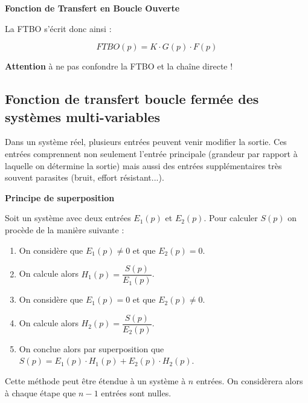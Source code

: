 \documentclass[11pt,oneside]{article}
\begin{document}
\begin{resultat}
\textbf{Fonction de Transfert en Boucle Ouverte}

La FTBO s'écrit donc ainsi :

$$
FTBO(p) = K \cdot G(p) \cdot F(p)
$$

\textbf{Attention} à ne pas confondre la FTBO et la chaîne directe !
\end{resultat}

\subsection{Fonction de transfert boucle fermée des systèmes multi-variables}
Dans un système réel, plusieurs entrées peuvent venir modifier la sortie. Ces
entrées comprennent non seulement l'entrée principale (grandeur par rapport à
laquelle on détermine la sortie) mais aussi des entrées
supplémentaires très souvent parasites (bruit, effort résistant...).

\begin{center}
\end{center}


\begin{methode}
\textbf{Principe de superposition}

Soit un système avec deux entrées $E_1(p)$ et $E_2(p)$. Pour calculer $S(p)$ on procède de la manière suivante : 
\begin{enumerate}
\item On considère que $E_1(p)\neq 0$ et que $E_2(p)=0$.
\item On calcule alors $H_1(p)=\dfrac{S(p)}{E_1(p)}$.
\item On considère que $E_1(p) = 0$ et que $E_2(p) \neq 0$.
\item On calcule alors $H_2(p)=\dfrac{S(p)}{E_2(p)}$.
\item On conclue alors par superposition que $S(p)=E_1(p) \cdot H_1(p) + E_2(p) \cdot H_2(p)$.
\end{enumerate}

Cette méthode peut être étendue à un système à $n$ entrées. On considèrera alors à chaque étape que $n-1$ entrées sont nulles.
\end{methode}
\end{document}
